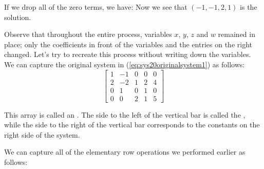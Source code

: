 \documentclass{ximera}
\begin{document}
\begin{exploration}
    If we drop all of the zero terms, we have:
Now we see that $(-1, -1, 2, 1)$ is the solution.

Observe that throughout the entire process, variables $x$, $y$, $z$ and $w$ remained in place; only the coefficients in front of the variables and the entries on the right changed.  Let's try to recreate this process without writing down the variables.  We can capture the original system in (\ref{eq:sys20originalsystem1}) as follows:
$$\left[\begin{array}{cccc|c}  
 1&-1&0&0&0\\2&-2&1&2&4\\0&1&0&1&0\\0&0&2&1&5
 \end{array}\right]$$

 This array is called an .  The side to the left of the vertical bar is called the , while the side to the right of the vertical bar corresponds to the constants on the right side of the system.
 
 We can capture all of the elementary row operations we performed earlier as follows:


\end{exploration}
\end{document}
